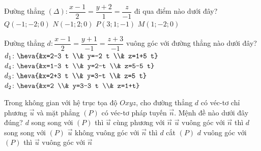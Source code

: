 \begin{ex}%
	Đường thẳng $(\Delta)\colon \dfrac{x-1}{2}=\dfrac{y+2}{1}=\dfrac{z}{-1}$ đi qua điểm nào dưới đây?
	\choice
	{$Q(-1 ;-2 ; 0)$}
	{$N(-1 ; 2 ; 0)$}
	{$P(3 ; 1 ;-1)$}
	{\True $M(1 ;-2 ; 0)$}
\end{ex}

\begin{ex}%
	Đường thẳng $d\colon \dfrac{x-1}{2}=\dfrac{y+1}{-1}=\dfrac{z+3}{-1}$ vuông góc với đường thẳng nào dưới đây?
	\choice
	{$d_1\colon \heva{&x=2-3 t \\& y=-2 t \\& z=1+5 t}$}
	{\True $d_4\colon \heva{&x=1-3 t \\& y=2-t \\& z=5-5 t}$}
	{$d_3\colon \heva{&x=2+3 t \\& y=3-t \\& z=5 t}$}
	{$d_2\colon \heva{&x=2 \\& y=3-3 t \\& z=1+t}$}
\end{ex}

\begin{ex}%
	Trong không gian với hệ trục tọa độ $Oxyz$, cho đường thẳng $d$ có véc-tơ chỉ phương $\overrightarrow{u}$ và mặt phẳng $(P)$ có véc-tơ pháp tuyến $\overrightarrow{n}$. Mệnh đề nào dưới đây đúng?
	\choice
	{$d$ song song với $(P)$ thì $\overrightarrow{u}$ cùng phương với $\overrightarrow{n}$}
	{$\overrightarrow{u}$ vuông góc với $\overrightarrow{n}$ thì $d$ song song với $(P)$}
	{\True $\overrightarrow{u}$ không vuông góc với $\overrightarrow{n}$ thì $d$ cắt $(P)$}
	{$d$ vuông góc với $(P)$ thì $\overrightarrow{u}$ vuông góc với $\overrightarrow{n}$}
\end{ex}

